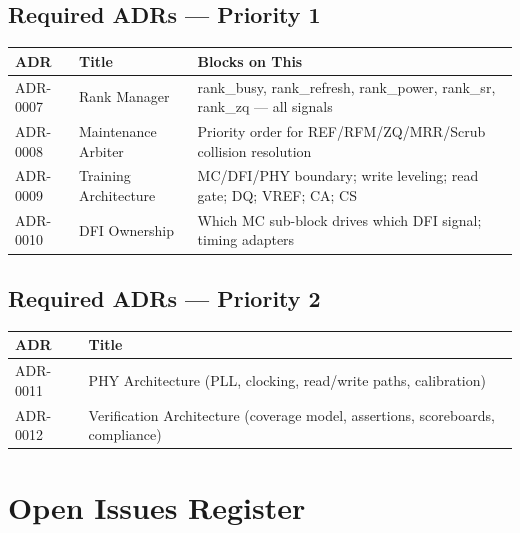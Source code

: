 \documentclass[10pt,a4paper]{article}
\newcommand{\Th}[1]{\cellcolor{thbg}\textbf{\small\color{acc1}#1}}
\newcommand{\RA}{\rowcolor{white}}
\newcommand{\RB}{\rowcolor{altbg}}
\begin{document}
\subsection{Required ADRs --- Priority 1}

\begin{center}
\begin{tabularx}{\linewidth}{@{} l l X @{}}
\toprule
\Th{ADR} & \Th{Title} & \Th{Blocks on This} \\
\midrule
\RB ADR-0007 & Rank Manager        & rank\_busy, rank\_refresh, rank\_power, rank\_sr, rank\_zq --- all signals \\
\RA ADR-0008 & Maintenance Arbiter & Priority order for REF/RFM/ZQ/MRR/Scrub collision resolution \\
\RB ADR-0009 & Training Architecture & MC/DFI/PHY boundary; write leveling; read gate; DQ; VREF; CA; CS \\
\RA ADR-0010 & DFI Ownership       & Which MC sub-block drives which DFI signal; timing adapters \\
\bottomrule
\end{tabularx}
\end{center}

\subsection{Required ADRs --- Priority 2}

\begin{center}
\begin{tabularx}{\linewidth}{@{} l l @{}}
\toprule
\Th{ADR} & \Th{Title} \\
\midrule
\RA ADR-0011 & PHY Architecture (PLL, clocking, read/write paths, calibration) \\
\RB ADR-0012 & Verification Architecture (coverage model, assertions, scoreboards, compliance) \\
\bottomrule
\end{tabularx}
\end{center}

\section{Open Issues Register}
\end{document}

